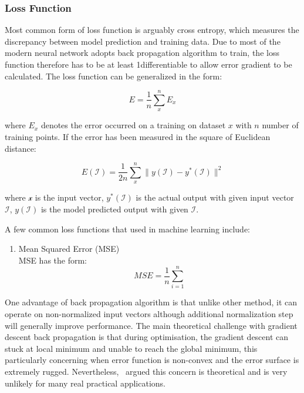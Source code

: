 \subsubsection{Loss Function}

Most common form of loss function is arguably cross entropy, which measures the discrepancy between model prediction and training data. Due to most of the modern neural network adopts back propagation algorithm to train, the loss function therefore has to be at least 1\textdegree differentiable to allow error gradient to be calculated. The loss function can be generalized in the form:

\begin{equation}
    E = \frac {1}{n} \sum_x^n E_x
\end{equation}

where $E_x$ denotes the error occurred on a training on dataset $x$ with $n$ number of training points. If the error has been measured in the square of Euclidean distance:

\begin{equation}
    E(\mathcal{I}) = \frac {1}{2n} \sum_x^n \parallel y(\mathcal{I}) - y^*(\mathcal{I}) \parallel^2 
\end{equation}

where $\mathcal{x}$ is the input vector, $y^*(\mathcal{I})$ is the actual output with given input vector $\mathcal{I}$, $y(\mathcal{I})$ is the model predicted output with given $\mathcal{I}$. 
\par 
A few common loss functions that used in machine learning include:

\begin{enumerate}
    \item Mean Squared Error (MSE) \\
MSE has the form:
\begin{equation}
    MSE = \frac{1}{n}\sum_{i=1}^n
\end{equation}

\end{enumerate}

\par 
One advantage of back propagation algorithm is that unlike other method, it can operate on non-normalized input vectors although additional normalization step will generally improve performance. \cite{Buckland:2002} The main theoretical challenge with gradient descent back propagation is that during optimisation, the gradient descent can stuck at local minimum and unable to reach the global minimum, this particularly concerning when error function is non-convex and the error surface is extremely rugged. Nevertheless,~\citet{LeCun_2015} argued this concern is theoretical and is very unlikely for many real practical applications. 